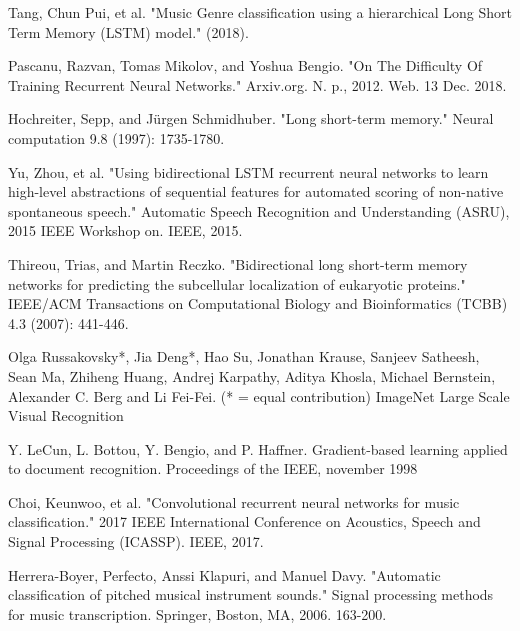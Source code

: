 \documentclass[letterpaper, 12 pt, conference]{ieeeconf}  %
\begin{document}
\begin{thebibliography}{99}
 Tang, Chun Pui, et al. "Music Genre classification using a hierarchical Long Short Term Memory (LSTM) model." (2018).

 Pascanu, Razvan, Tomas Mikolov, and Yoshua Bengio. "On The Difficulty Of Training Recurrent Neural Networks." Arxiv.org. N. p., 2012. Web. 13 Dec. 2018.

 Hochreiter, Sepp, and Jürgen Schmidhuber. "Long short-term memory." Neural computation 9.8 (1997): 1735-1780.

 Yu, Zhou, et al. "Using bidirectional LSTM recurrent neural networks to learn high-level abstractions of sequential features for automated scoring of non-native spontaneous speech." Automatic Speech Recognition and Understanding (ASRU), 2015 IEEE Workshop on. IEEE, 2015.

 Thireou, Trias, and Martin Reczko. "Bidirectional long short-term memory networks for predicting the subcellular localization of eukaryotic proteins." IEEE/ACM Transactions on Computational Biology and Bioinformatics (TCBB) 4.3 (2007): 441-446.

 Olga Russakovsky*, Jia Deng*, Hao Su, Jonathan Krause, Sanjeev Satheesh, Sean Ma, Zhiheng Huang, Andrej Karpathy, Aditya Khosla, Michael Bernstein, Alexander C. Berg and Li Fei-Fei. (* = equal contribution) ImageNet Large Scale Visual Recognition 

 Y. LeCun, L. Bottou, Y. Bengio, and P. Haffner. Gradient-based learning applied to document recognition. Proceedings of the IEEE, november 1998

 Choi, Keunwoo, et al. "Convolutional recurrent neural networks for music classification." 2017 IEEE International Conference on Acoustics, Speech and Signal Processing (ICASSP). IEEE, 2017.

 Herrera-Boyer, Perfecto, Anssi Klapuri, and Manuel Davy. "Automatic classification of pitched musical instrument sounds." Signal processing methods for music transcription. Springer, Boston, MA, 2006. 163-200.

\end{thebibliography}










\end{document}
